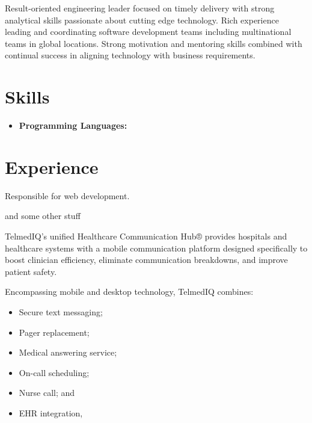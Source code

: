 \documentclass[11pt,a4paper,roman]{moderncv}       %
\begin{document}
\makecvtitle

\small{Result-oriented engineering leader focused on timely delivery with strong analytical skills passionate about cutting edge technology. Rich experience leading and coordinating software development teams including multinational teams in global locations. Strong motivation and mentoring skills combined with continual success in aligning technology with business requirements.}

\section{Skills}

\vspace{6pt}

\begin{itemize}

\item \textbf{Programming Languages:} 

\end{itemize}

\section{Experience}

\vspace{6pt}


Responsible for web development.

and some other stuff

\vspace{16pt}


TelmedIQ’s unified Healthcare Communication Hub® provides hospitals and healthcare systems with a mobile communication platform designed specifically to boost clinician efficiency, eliminate communication breakdowns, and improve patient safety.

Encompassing mobile and desktop technology, TelmedIQ combines:
\begin{itemize}
    \item Secure text messaging;
    \item Pager replacement;
    \item Medical answering service;
    \item On-call scheduling;
    \item Nurse call; and
    \item EHR integration, 
\end{itemize}
\end{document}
